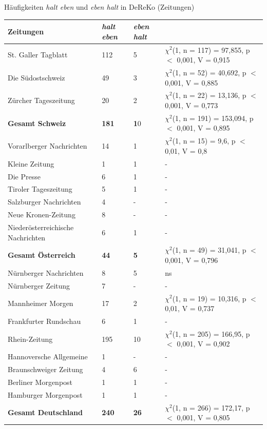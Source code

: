 \begin{exe}
	\ex\label{620} Häufigkeiten \textit{halt eben} und \textit{eben halt} in DeReKo (Zeitungen)\\[-0.5em]
	\scriptsize
     \begin{tabular}[t]{|l|l|l|l|}
     \hline
	 Zeitungen & \textit{halt eben} & \textit{eben halt} &  \\
	 \hline
	 St. Galler Tagblatt & 112 & 5 & $\chi^2$(1, n = 117) = 97,855, p $<$ 0,001, V = 0,915\\
	 \hline
	 Die Südostschweiz & 49 &3 & $\chi^2$(1, n = 52) = 40,692, p $<$ 0,001, V = 0,885\\
	 \hline
	 Zürcher Tageszeitung & 20 & 2 & $\chi^2$(1, n = 22) = 13,136, p $<$ 0,001, V = 0,773\\
	 \hdashline
	 \textbf{Gesamt Schweiz} & \textbf{181} & \textbf{1}0 & $\chi^2$(1, n = 191) = 153,094, p $<$ 0,001, V = 0,895\\
	 \hline\hline
	 Vorarlberger Nachrichten & 14 & 1 & $\chi^2$(1, n = 15) = 9,6, p $<$ 0,01, V = 0,8\\
	 \hline
	 Kleine Zeitung & 1 & 1 & -\\
	 \hline
	 Die Presse & 6 & 1 & -\\
	 \hline
	 Tiroler Tageszeitung & 5 & 1 & -\\
	 \hline
	 Salzburger Nachrichten & 4 & - & - \\
	 \hline
	 Neue Kronen-Zeitung & 8 & - & -\\
	 \hline
	 Niederösterreichische Nachrichten & 6 & 1 & -\\
	 \hdashline
	 \textbf{Gesamt Österreich} & \textbf{44} & \textbf{5} & $\chi^2$(1, n = 49) = 31,041, p $<$ 0,001, V = 0,796\\
	 \hline\hline
	 Nürnberger Nachrichten & 8 & 5 & ns\\
	 \hline
	 Nürnberger Zeitung & 7 & - & -\\
	 \hline
	 Mannheimer Morgen & 17 & 2 & $\chi^2$(1, n = 19) = 10,316, p $<$ 0,01, V = 0,737\\
	 \hline
	 Frankfurter Rundschau & 6 & 1 & -\\
	 \hline
	 Rhein-Zeitung & 195 & 10 & $\chi^2$(1, n = 205) = 166,95, p $<$ 0,001, V = 0,902\\
	 \hline
	 Hannoversche Allgemeine & 1 & - & -\\
	 \hline
	 Braunschweiger Zeitung & 4 & 6 & -\\
	 \hline
	 Berliner Morgenpost & 1 & 1 & -\\
	 \hline
	 Hamburger Morgenpost & 1 & 1 & -\\
	 \hdashline
	 \textbf{Gesamt Deutschland} & \textbf{240} & \textbf{26} & $\chi^2$(1, n = 266) = 172,17, p $<$ 0,001, V = 0,805\\
	 \hline\hline
     \end{tabular}
\end{exe}
